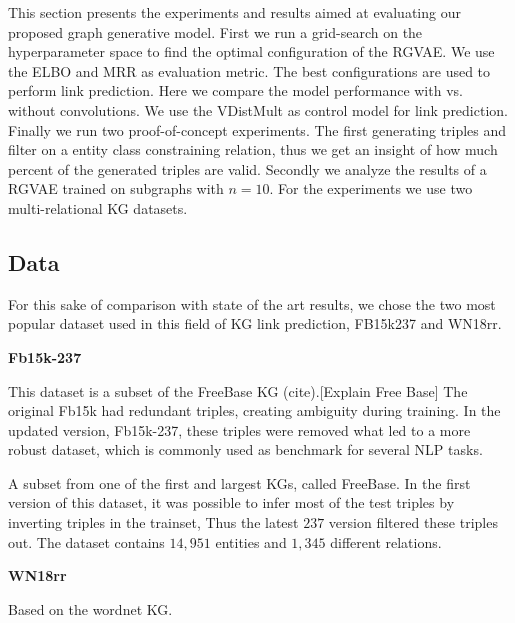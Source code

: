 
This section presents the experiments and results aimed at evaluating our proposed graph generative model. First we run a grid-search on the hyperparameter space to find the optimal configuration of the RGVAE. We use the ELBO and MRR as evaluation metric. The best configurations are used to perform link prediction. Here we compare the model performance with vs. without convolutions. We use the VDistMult as control model for link prediction. Finally we run two proof-of-concept experiments. The first generating triples and filter on a entity class constraining relation, thus we get an insight of how much percent of the generated triples are valid. Secondly we analyze the results of a RGVAE trained on subgraphs with $n=10$. For the experiments we use two multi-relational KG datasets.



\subsection{Data}
For this sake of comparison with state of the art results, we chose the two most popular dataset used in this field of KG link prediction, FB15k237 and WN18rr.


\textbf{Fb15k-237}

\prntlen{\textwidth}


This dataset is a subset of the FreeBase KG (cite).[Explain Free Base] The original Fb15k had redundant triples, creating ambiguity during training. In the updated version, Fb15k-237, these triples were removed what led to a more robust dataset, which is commonly used as benchmark for several NLP tasks.

A subset from one of the first and largest KGs, called FreeBase. In the first version of this dataset, it was possible to infer most of the test triples by inverting triples in the trainset, Thus the latest $237$ version filtered these triples out.
The dataset contains $14,951$ entities and $1,345$ different relations.

\textbf{WN18rr}

Based on the wordnet KG.

